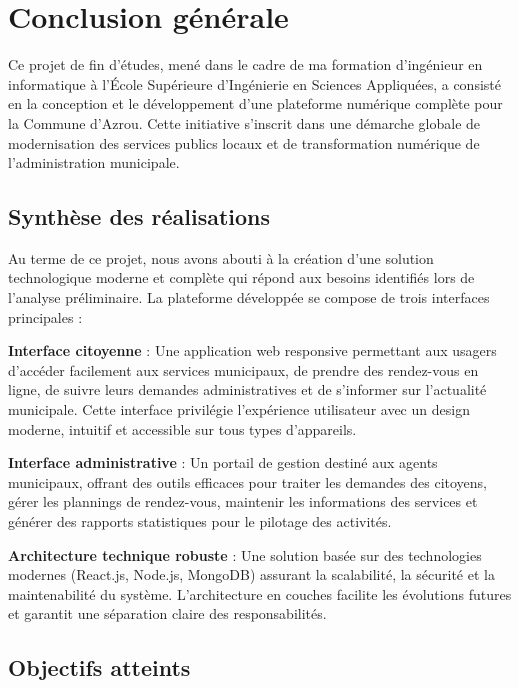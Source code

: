 \chapter*{Conclusion générale}

Ce projet de fin d'études, mené dans le cadre de ma formation d'ingénieur en informatique à l'École Supérieure d'Ingénierie en Sciences Appliquées, a consisté en la conception et le développement d'une plateforme numérique complète pour la Commune d'Azrou. Cette initiative s'inscrit dans une démarche globale de modernisation des services publics locaux et de transformation numérique de l'administration municipale.

\section*{Synthèse des réalisations}

Au terme de ce projet, nous avons abouti à la création d'une solution technologique moderne et complète qui répond aux besoins identifiés lors de l'analyse préliminaire. La plateforme développée se compose de trois interfaces principales :

\textbf{Interface citoyenne} : Une application web responsive permettant aux usagers d'accéder facilement aux services municipaux, de prendre des rendez-vous en ligne, de suivre leurs demandes administratives et de s'informer sur l'actualité municipale. Cette interface privilégie l'expérience utilisateur avec un design moderne, intuitif et accessible sur tous types d'appareils.

\textbf{Interface administrative} : Un portail de gestion destiné aux agents municipaux, offrant des outils efficaces pour traiter les demandes des citoyens, gérer les plannings de rendez-vous, maintenir les informations des services et générer des rapports statistiques pour le pilotage des activités.

\textbf{Architecture technique robuste} : Une solution basée sur des technologies modernes (React.js, Node.js, MongoDB) assurant la scalabilité, la sécurité et la maintenabilité du système. L'architecture en couches facilite les évolutions futures et garantit une séparation claire des responsabilités.

\section*{Objectifs atteints}

